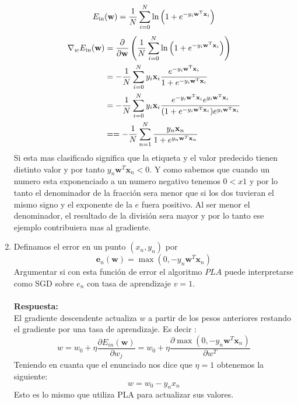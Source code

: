 \documentclass[12pt,a4paper]{article}
\begin{document}
\begin{enumerate}
\begin{equation}
\begin{aligned}
\notag
E_{\mathrm{in}}(\mathbf{w})=\frac{1}{N} \sum_{i=0}^{N} \ln \left(1+e^{-y_{i} \mathbf{w}^{\mathrm{T}} \mathbf{x}_{i}}\right)
\end{aligned}
\end{equation}
\begin{equation}
\begin{aligned}
\notag
\nabla_{w} E_{\mathrm{in}}(\mathbf{w}) &=\frac{\partial}{\partial \mathbf{w}}\left(\frac{1}{N} \sum_{i=0}^{N} \ln \left(1+e^{-y_{i} \mathbf{w}^{\mathrm{T}} \mathbf{x}_{i}}\right)\right) \\ &= -\frac{1}{N} \sum_{i=0}^{N}y_{i} \mathbf{x}_{i} \frac{e^{-y_{i} \mathbf{w}^{\mathrm{T}} \mathbf{x}_{i}}}{1+e^{-y_{i} \mathbf{w}^{\mathrm{T}} \mathbf{x}_{i}}} \\ &= -\frac{1}{N} \sum_{i=0}^{N}y_{i} \mathbf{x}_{i} \frac{e^{-y_{i} \mathbf{w}^{\mathrm{T}} \mathbf{x}_{i}}e^{y_{i} \mathbf{w}^{\mathrm{T}} \mathbf{x}_{i}}}{(1+e^{-y_{i} \mathbf{w}^{\mathrm{T}} \mathbf{x}_{i}})e^{y_{i} \mathbf{w}^{\mathrm{T}} \mathbf{x}_{i}}} \\ &= =-\frac{1}{N} \sum_{n=1}^{N} \frac{y_{n} \mathbf{x}_{n}}{1+e^{y_{n} \mathbf{w}^{T} \mathbf{x}_{n}}} 
\end{aligned}
\end{equation}
Si esta mas clasificado significa que la etiqueta y el valor predecido tienen distinto valor y por tanto $y_{n} \boldsymbol{w}^{T} \boldsymbol{x}_{n} < 0$. Y como sabemos que cuando un numero esta exponenciado a un numero negativo tenemos $0 < x 1$ y por lo tanto el denominador de la fracción sera menor que si los dos tuvieran el mismo signo y el exponente de la $e$ fuera positivo. Al ser menor el denominador, el resultado de la división sera mayor y por lo tanto ese ejemplo contribuiera mas al gradiente. 
\item Definamos el error en un punto $(x_n,y_n)$ por $$\mathbf{e}_{n}(\mathbf{w})=\max \left(0,-y_{n} \mathbf{w}^{T} \mathbf{x}_{n}\right)$$ Argumentar si con esta función de error el algoritmo $PLA$ puede interpretarse como SGD sobre $e_n$ con tasa de aprendizaje $v=1$.\\\\\textbf{Respuesta:}\\
El gradiente descendente actualiza $w$ a partir de los pesos anteriores restando el gradiente por una tasa de aprendizaje. Es decir : $$ w = w_0+\eta \frac{\partial E_{i n}(\mathbf{w})}{\partial w_{j}} = w_0+\eta \frac{\partial \max \left(0,-y_{n} \mathbf{w}^{T} \mathbf{x}_{n}\right)}{\partial w^{T}}$$
Teniendo en cuanta que el enunciado nos dice que $\eta = 1$ obtenemos la siguiente:
$$
w = w_0-y_nx_n
$$
Esto es lo mismo que utiliza PLA para actualizar sus valores.
\end{enumerate}
\clearpage


\end{document}
